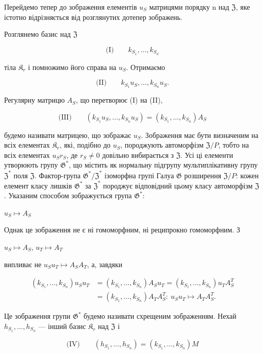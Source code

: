 \documentclass[11pt]{article}
\begin{document}
Перейдемо тепер до зображення елементів \(u_S\) матрицями порядку n над \(\mathfrak{Z}\), яке істотно відрізняється від розглянутих дотепер зображень.

Розглянемо базис над \(\mathfrak Z\)

\[
\text{(I)}\qquad k_{S_1}, \ldots, k_{S_n}
\]

тіла \(\mathfrak K_r\) і помножимо його справа на \(u_S\). Отримаємо

\[
\text{(II)}\qquad k_{S_1}u_S, \ldots, k_{S_n}u_S.
\]

Регулярну матрицю \(A_S\), що перетворює (I) на (II),

\[
\text{(III)}\qquad (k_{S_1}u_S, \ldots, k_{S_n}u_S) = (k_{S_1}, \ldots, k_{S_n})A_S
\]

будемо називати матрицею, що зображає \(u_S\). Зображення має бути визначеним на всіх елементах \(\mathfrak K_{r}\), які, подібно до \(u_S\), породжують автоморфізм \(\mathfrak Z/P\), тобто на всіх елементах \(u_Sr_S\), де \(r_S \neq 0\) довільно вибирається з \(\mathfrak Z\). Усі ці елементи утворюють групу \(\mathfrak G^*\), що містить як нормальну підгрупу мультиплікативну групу \(\mathfrak Z^*\) поля \(\mathfrak Z\). Фактор-група \(\mathfrak G^*/\mathfrak Z^*\) ізоморфна групі Галуа \(\mathfrak G\) розширення \(\mathfrak Z/P\): кожен елемент класу лишків \(\mathfrak G^*\) за \(\mathfrak Z^*\) породжує відповідний цьому класу автоморфізм \(\mathfrak Z\). Указаним способом зображується група \(\mathfrak G^*\):

\(u_S \mapsto A_S\)

Однак це зображення не є ні гомоморфним, ні реципрокно гомоморфним. З

\(u_S \mapsto A_S\), \(u_T \mapsto A_T\)

випливає не \(u_Su_T \mapsto A_SA_T\), а, завдяки

\[
\begin{aligned}
(k_{S_1}, \ldots, k_{S_n})u_Su_T
&=(k_{S_1}, \ldots, k_{S_n})A_Su_T
=(k_{S_1}, \ldots, k_{S_n})u_TA_S^T\\
&=(k_{S_1}, \ldots, k_{S_n})A_TA_S^T:\ u_Su_T\mapsto A_TA_S^T.
\end{aligned}
\]

Це зображення групи \(\mathfrak{G}^*\) будемо називати схрещеним зображенням. Нехай \(h_{S_1}, \ldots, h_{S_n}\) --- інший базис \(\mathfrak{K}_r\) над \(\mathfrak{Z}\) і

\[
\text{(IV)}\qquad (h_{S_1}, \ldots, h_{S_n}) = (k_{S_1}, \ldots, k_{S_n})M
\]
\end{document}
